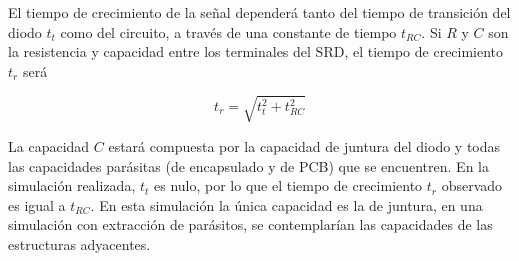 El tiempo de crecimiento de la señal dependerá tanto del tiempo de transición
del diodo $t_t$ como del circuito, a través de una constante de tiempo $t_{RC}$.
Si $R$ y $C$ son la resistencia y capacidad entre los terminales del SRD, el
tiempo de crecimiento $t_r$ será \cite{an918}

\begin{equation}
    t_r = \sqrt{t_t^2+t_{RC}^2}
\end{equation}

La capacidad $C$ estará compuesta por la capacidad de juntura del diodo y todas
las capacidades parásitas (de encapsulado y de PCB) que se encuentren. En la
simulación realizada, $t_t$ es nulo, por lo que el tiempo de crecimiento $t_r$
observado es igual a $t_{RC}$. En esta simulación la única capacidad es la de
juntura, en una simulación con extracción de parásitos, se contemplarían las
capacidades de las estructuras adyacentes.
